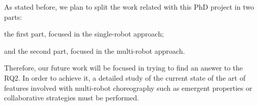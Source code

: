 As stated before, we plan to split the work related with this PhD project in two parts: 
\begin{enumerate*}
\item the first part, focused in the single-robot approach;
\item and the second part, focused in the multi-robot approach.
\end{enumerate*}

Therefore, our future work will be focused in trying to find an answer to the RQ2.
In order to achieve it, a detailed study of the current state of the art of features involved with multi-robot choreography such as emergent properties or collaborative strategies must be performed.
